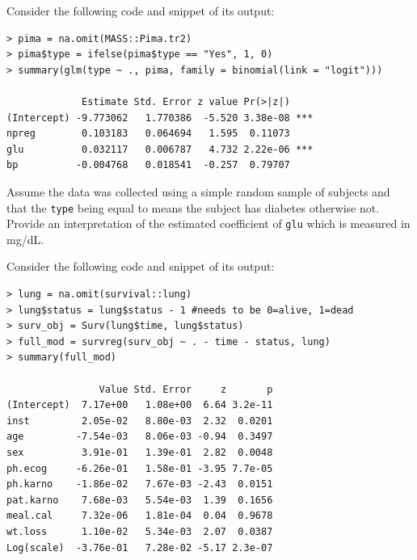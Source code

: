 \documentclass[12pt]{article}
\begin{document}
\begin{enumerate}[(a)]

 Consider the following code and snippet of its output:

\begin{Verbatim}[frame=single]
> pima = na.omit(MASS::Pima.tr2)
> pima$type = ifelse(pima$type == "Yes", 1, 0)
> summary(glm(type ~ ., pima, family = binomial(link = "logit")))

             Estimate Std. Error z value Pr(>|z|)    
(Intercept) -9.773062   1.770386  -5.520 3.38e-08 ***
npreg        0.103183   0.064694   1.595  0.11073    
glu          0.032117   0.006787   4.732 2.22e-06 ***
bp          -0.004768   0.018541  -0.257  0.79707    
\end{Verbatim}

Assume the data was collected using a simple random sample of subjects and that the \texttt{type} being equal to  means the subject has diabetes otherwise not. Provide an interpretation of the estimated coefficient of \texttt{glu} which is measured in mg/dL.

\iftoggle{solutions}{\inred{
When comparing two subjects (A) and (B) which are sampled in the same fashion as the other subjects in this dataset where (A) has a \texttt{glu} measurement 1mg/dL larger than (B)'s \texttt{glu} measurement but share the same other observed measurements otherwise, then (A) is predicted to have an estimated log odds probability of diabetes 0.032 $\pm$ 0.007 higher than (B)'s log odds probability of diabetes assuming the log odds probability of diabetes is linear in the measurements considered herein and this model remains stationary.
}}{~\spc{3}}
\pagebreak

 Consider the following code and snippet of its output:

\begin{Verbatim}[frame=single]
> lung = na.omit(survival::lung)
> lung$status = lung$status - 1 #needs to be 0=alive, 1=dead
> surv_obj = Surv(lung$time, lung$status)
> full_mod = survreg(surv_obj ~ . - time - status, lung)
> summary(full_mod)

                Value Std. Error     z       p
(Intercept)  7.17e+00   1.08e+00  6.64 3.2e-11
inst         2.05e-02   8.80e-03  2.32  0.0201
age         -7.54e-03   8.06e-03 -0.94  0.3497
sex          3.91e-01   1.39e-01  2.82  0.0048
ph.ecog     -6.26e-01   1.58e-01 -3.95 7.7e-05
ph.karno    -1.86e-02   7.67e-03 -2.43  0.0151
pat.karno    7.68e-03   5.54e-03  1.39  0.1656
meal.cal     7.32e-06   1.81e-04  0.04  0.9678
wt.loss      1.10e-02   5.34e-03  2.07  0.0387
Log(scale)  -3.76e-01   7.28e-02 -5.17 2.3e-07


\end{Verbatim}
\end{enumerate}
\end{document}
